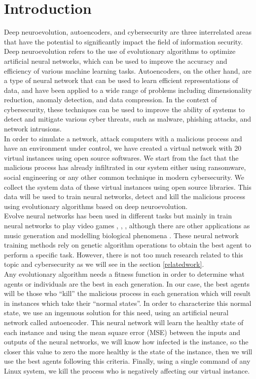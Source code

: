 \documentclass{iosart2c}
\begin{document}
\section{Introduction}
Deep neuroevolution, autoencoders, and cybersecurity are three interrelated areas that have the potential to significantly impact the field of information security. Deep neuroevolution refers to the use of evolutionary algorithms to optimize artificial neural networks, which can be used to improve the accuracy and efficiency of various machine learning tasks. Autoencoders, on the other hand, are a type of neural network that can be used to learn efficient representations of data, and have been applied to a wide range of problems including dimensionality reduction, anomaly detection, and data compression. In the context of cybersecurity, these techniques can be used to improve the ability of systems to detect and mitigate various cyber threats, such as malware, phishing attacks, and network intrusions.\\

In order to simulate a network, attack computers with a malicious process and have an environment under control, we have created a virtual network with 20 virtual instances using open source softwares. We start from the fact that the malicious process has already infiltrated in our system either using ransomware, social engineering or any other common technique in modern cybersecurity. We collect the system data of these virtual instances using open source libraries. This data will be used to train neural networks, detect and kill the malicious process using evolutionary algorithms based on deep neuroevolution.\\

Evolve neural networks has been used in different tasks but mainly in train neural networks to play video games \cite{deepGA}, \cite{neuroevolution1}, \cite{neuroevolution2}, although there are other applications as music generation \cite{neuroevolution3} and modelling biological phenomena \cite{neuroevolution4}. These neural network training methods rely on genetic algorithm operations to obtain the best agent to perform a specific task. However, there is not too much research related to this topic and cybersecurity as we will see in the section \ref{relatedwork}.\\

Any evolutionary algorithm needs a fitness function in order to determine what agents or individuals are the best in each generation. In our case, the best agents will be those who ``kill'' the malicious process in each generation which will result in instances which take their ``normal states''. In order to characterize this normal state, we use an ingenuous solution for this need, using an artificial neural network called autoencoder. This neural network will learn the healthy state of each instance and using the mean square error (MSE) between the inputs and outputs of the neural networks, we will know how infected is the instance, so the closer this value to zero the more healthy is the state of the instance, then we will use the best agents following this criteria. Finally, using a single command of any Linux system, we kill the process who is negatively affecting our virtual instance.
\end{document}
